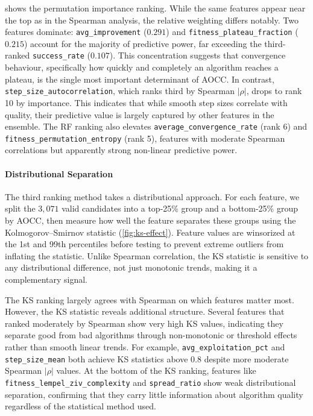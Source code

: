  shows the permutation importance ranking. While the same features appear near the top as in the Spearman analysis, the relative weighting differs notably. Two features dominate: \texttt{avg\_improvement} ($0.291$) and \texttt{fitness\_plateau\_fraction} ($0.215$) account for the majority of predictive power, far exceeding the third-ranked \texttt{success\_rate} ($0.107$). This concentration suggests that convergence behaviour, specifically how quickly and completely an algorithm reaches a plateau, is the single most important determinant of AOCC. In contrast, \texttt{step\_size\_autocorrelation}, which ranks third by Spearman $|\rho|$, drops to rank 10 by importance. This indicates that while smooth step sizes correlate with quality, their predictive value is largely captured by other features in the ensemble. The RF ranking also elevates \texttt{average\_convergence\_rate} (rank 6) and \texttt{fitness\_permutation\_entropy} (rank 5), features with moderate Spearman correlations but apparently strong non-linear predictive power.

\paragraph{Distributional Separation}
\label{sec:results-ks}

The third ranking method takes a distributional approach. For each feature, we split the $3{,}071$ valid candidates into a top-25\% group and a bottom-25\% group by AOCC, then measure how well the feature separates these groups using the Kolmogorov--Smirnov statistic (\cref{fig:ks-effect}). Feature values are winsorized at the 1st and 99th percentiles before testing to prevent extreme outliers from inflating the statistic. Unlike Spearman correlation, the KS statistic is sensitive to any distributional difference, not just monotonic trends, making it a complementary signal.

The KS ranking largely agrees with Spearman on which features matter most. However, the KS statistic reveals additional structure. Several features that ranked moderately by Spearman show very high KS values, indicating they separate good from bad algorithms through non-monotonic or threshold effects rather than smooth linear trends. For example, \texttt{avg\_exploitation\_pct} and \texttt{step\_size\_mean} both achieve KS statistics above 0.8 despite more moderate Spearman $|\rho|$ values. At the bottom of the KS ranking, features like \texttt{fitness\_lempel\_ziv\_complexity} and \texttt{spread\_ratio} show weak distributional separation, confirming that they carry little information about algorithm quality regardless of the statistical method used.

